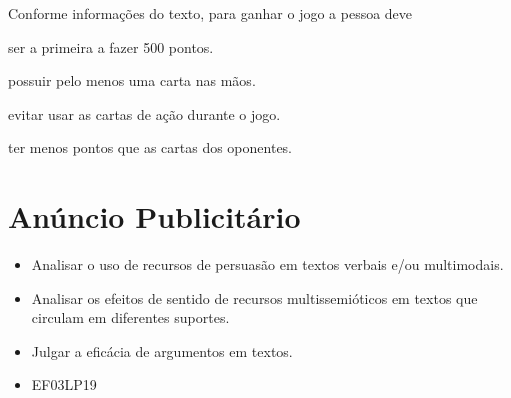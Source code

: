 Conforme informações do texto, para ganhar o jogo a pessoa deve

\begin{escolha}
\item ser a primeira a fazer 500 pontos.

\item possuir pelo menos uma carta nas mãos.

\item evitar usar as cartas de ação durante o jogo.

\item ter menos pontos que as cartas dos oponentes.
\end{escolha}

\chapter{Anúncio Publicitário}



\begin{itemize}
\item Analisar o uso de recursos de persuasão em textos verbais e/ou multimodais.

\item Analisar os efeitos de sentido de recursos multissemióticos em textos que circulam em diferentes suportes.

\item Julgar a eficácia de argumentos em textos.
\end{itemize}


\begin{itemize}
	\item 
EF03LP19
\end{itemize}


